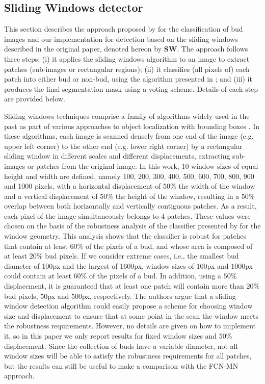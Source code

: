 \documentclass[a4paper,authoryear,review]{elsarticle}
\begin{document}
	\subsection{Sliding Windows detector}
	\label{sec:sw}
	
	This section describes the approach proposed by \citet{perez2017image} for the classification of bud images and our implementation for detection based on the sliding windows described in the original paper, denoted hereon by \textbf{SW}. The approach follows three steps: (i) it applies the sliding windows algorithm to an image to extract patches (sub-images or rectangular regions); (ii) it classifies (all pixels of) each patch into either bud or non-bud, using the algorithm presented in \citet{perez2017image}; and (iii) it produces the final segmentation mask using a voting scheme. Details of each step are provided below.
	
	Sliding windows techniques comprise a family of algorithms widely used in the past as part of various approaches to object localization with bounding boxes \citep{divvala2009empirical, wang2009hog, chum2007exemplar, ferrari2007groups, dalal2005histograms, rowley1996human}. In these algorithms, each image is scanned densely from one end of the image (e.g. upper left corner) to the other end (e.g. lower right corner) by a rectangular sliding window in different scales and different displacements, extracting sub-images or patches from the original image. In this work, 10 window sizes of equal height and width are defined, namely 100, 200, 300, 400, 500, 600, 700, 800, 900 and 1000 pixels, with a horizontal displacement of $50\%$ the width of the window and a vertical displacement of $50\%$ the height of the window, resulting in a $50\%$ overlap between both horizontally and vertically contiguous patches. As a result, each pixel of the image simultaneously belongs to 4 patches. These values were chosen on the basis of the robustness analysis of the classifier presented by \citet{perez2017image} for the window geometry. This analysis shows that the classifier is robust for patches that contain at least $60\%$ of the pixels of a bud, and whose area is composed of at least $20\%$ bud pixels. If we consider extreme cases, i.e., the smallest bud diameter of 100px and the largest of 1600px, window sizes of $100$px and $1000$px could contain at least $60\%$ of the pixels of a bud. In addition, using a $50\%$ displacement, it is guaranteed that at least one patch will contain more than $20\%$ bud pixels, $50$px and $500$px, respectively. The authors argue that a sliding window detection algorithm could easily propose a scheme for choosing window size and displacement to ensure that at some point in the scan the window meets the robustness requirements. However, no details are given on how to implement it, so in this paper we only report results for fixed window sizes and $50\%$ displacement. Since the collection of buds have a variable diameter, not all window sizes will be able to satisfy the robustness requirements for all patches, but the results can still be useful to make a comparison with the FCN-MN approach.  
	
\end{document}
